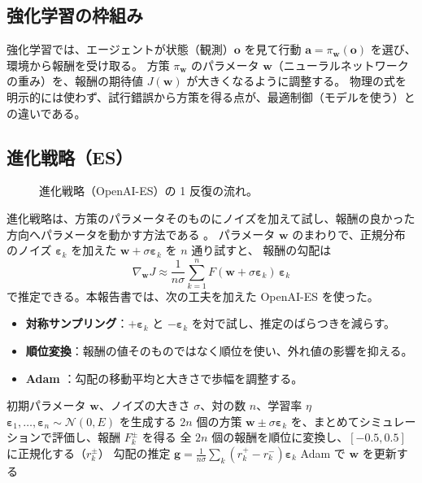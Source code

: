 \subsection{強化学習の枠組み}

強化学習では、エージェントが状態（観測）$\bm o$ を見て行動 $\bm a = \pi_{\bm w}(\bm o)$ を選び、環境から報酬を受け取る。
方策 $\pi_{\bm w}$ のパラメータ $\bm w$（ニューラルネットワークの重み）を、報酬の期待値 $J(\bm w)$ が大きくなるように調整する。
物理の式を明示的には使わず、試行錯誤から方策を得る点が、最適制御（モデルを使う）との違いである。

\subsection{進化戦略（ES）}

\begin{figure}[htbp]\centering
\resizebox{0.85\linewidth}{!}{}
\caption{進化戦略（OpenAI-ES）の 1 反復の流れ。}\label{fig:tikz-esloop}
\end{figure}

進化戦略は、方策のパラメータそのものにノイズを加えて試し、報酬の良かった方向へパラメータを動かす方法である \cite{R19}。
パラメータ $\bm w$ のまわりで、正規分布のノイズ $\bm\varepsilon_k$ を加えた $\bm w+\sigma\bm\varepsilon_k$ を $n$ 通り試すと、
報酬の勾配は
\begin{equation}
\nabla_{\bm w}J \approx \frac{1}{n\sigma}\sum_{k=1}^n F(\bm w+\sigma\bm\varepsilon_k)\,\bm\varepsilon_k
\end{equation}
で推定できる。本報告書では、次の工夫を加えた OpenAI-ES を使った。
\begin{itemize}
\item \textbf{対称サンプリング}：$+\bm\varepsilon_k$ と $-\bm\varepsilon_k$ を対で試し、推定のばらつきを減らす。
\item \textbf{順位変換}：報酬の値そのものではなく順位を使い、外れ値の影響を抑える。
\item \textbf{Adam} \cite{R20}：勾配の移動平均と大きさで歩幅を調整する。
\end{itemize}

\begin{algorithm}[htbp]
\caption{OpenAI-ES（本報告書の実装）}
\begin{algorithmic}[1]
\Require 初期パラメータ $\bm w$、ノイズの大きさ $\sigma$、対の数 $n$、学習率 $\eta$
  \State $\bm\varepsilon_1,\dots,\bm\varepsilon_n\sim\mathcal N(0,E)$ を生成する
  \State $2n$ 個の方策 $\bm w\pm\sigma\bm\varepsilon_k$ を、まとめてシミュレーションで評価し、報酬 $F_k^\pm$ を得る
  \State 全 $2n$ 個の報酬を順位に変換し、$[-0.5, 0.5]$ に正規化する（$r_k^\pm$）
  \State 勾配の推定 $\bm g = \frac{1}{n\sigma}\sum_k (r_k^+-r_k^-)\bm\varepsilon_k$
  \State Adam で $\bm w$ を更新する
\EndFor
\end{algorithmic}
\end{algorithm}


